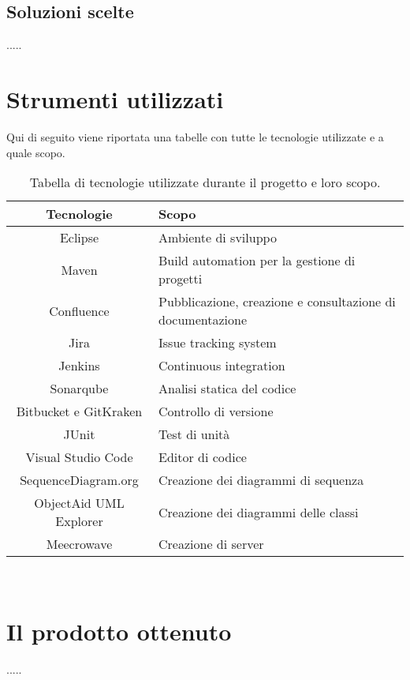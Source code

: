 \subsection{Soluzioni scelte}
.....

\section{Strumenti utilizzati}
Qui di seguito viene riportata una tabelle con tutte le tecnologie utilizzate e a quale scopo.

\begin{table}[H]
	{\def\arraystretch{1.5}
    \begin{tabularx}{\textwidth}{c | X}
        \textbf{Tecnologie} &
        \textbf{Scopo} \\ \hline
        Eclipse & Ambiente di sviluppo \\
        Maven & Build automation per la gestione di progetti \\
        Confluence & Pubblicazione, creazione e consultazione di documentazione \\
        Jira & Issue tracking system \\
        Jenkins & Continuous integration \\
        Sonarqube & Analisi statica del codice \\
        Bitbucket e GitKraken & Controllo di versione \\
        JUnit & Test di unità \\
        Visual Studio Code & Editor di codice \\
        SequenceDiagram.org & Creazione dei diagrammi di sequenza \\
        ObjectAid UML Explorer & Creazione dei diagrammi delle classi \\
        Meecrowave & Creazione di server \\
    \end{tabularx}} \\
\caption{Tabella di tecnologie utilizzate durante il progetto e loro scopo.}
\end{table}


\section{Il prodotto ottenuto}
.....

